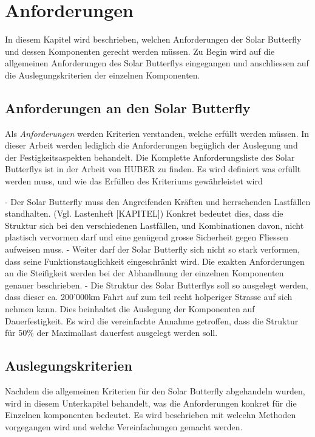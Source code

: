 \section{Anforderungen}
In diesem Kapitel wird beschrieben, welchen Anforderungen der Solar Butterfly und dessen Komponenten gerecht werden müssen. Zu Begin wird auf die allgemeinen Anforderungen des Solar Butterflys eingegangen und anschliessen auf die Auslegungskriterien der einzelnen Komponenten.

\subsection{Anforderungen an den Solar Butterfly}
Als \emph{Anforderungen} werden Kriterien verstanden, welche erfüllt werden müssen. In dieser Arbeit werden lediglich die Anforderungen begüglich der Auslegung und der Festigkeitsaspekten behandelt. Die Komplette Anforderungsliste des Solar Butterflys ist in der Arbeit von HUBER zu finden. Es wird definiert was erfüllt werden muss, und wie das Erfüllen des Kriteriums gewährleistet wird


- Der Solar Butterfly muss den Angreifenden Kräften und herrschenden Lastfällen standhalten. (Vgl. Lastenheft [KAPITEL]) Konkret bedeutet dies, dass die Struktur sich bei den verschiedenen Lastfällen, und Kombinationen davon, nicht plastisch vervormen darf und eine genügend grosse Sicherheit gegen Fliessen aufweisen muss.
- Weiter darf der Solar Butterfly sich nicht so stark verformen, dass seine Funktionstauglichkeit eingeschränkt wird. Die exakten Anforderungen an die Steifigkeit werden bei der Abhandlnung der einzelnen Komponenten genauer beschrieben.
- Die Struktur des Solar Butterflys soll so ausgelegt werden, dass dieser ca. 200'000km Fahrt auf zum teil recht holperiger Strasse auf sich nehmen kann. Dies beinhaltet die Auslegung der Komponenten auf Dauerfestigkeit. Es wird die vereinfachte Annahme getroffen, dass die Struktur für 50\% der Maximallast dauerfest ausgelegt werden soll.


\subsection{Auslegungskriterien}
Nachdem die allgemeinen Kriterien für den Solar Butterfly abgehandeln wurden, wird in diesem Unterkapitel behandelt, was die Anforderungen konkret für die Einzelnen komponenten bedeutet. Es wird beschrieben mit welcehn Methoden vorgegangen wird und welche Vereinfachungen gemacht werden.

